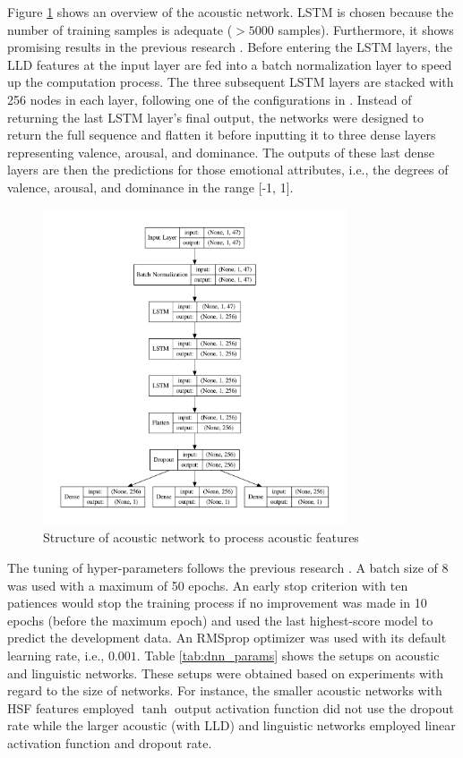 Figure \ref{fig:acoustic_model} shows an overview of the acoustic network.
LSTM is chosen because the number of training samples is adequate ($> 5000$
samples). Furthermore, it shows promising results in the previous research
\cite{Schmitt2018}.  Before entering the LSTM layers, the LLD features at the
input layer are fed into a batch normalization layer to speed up the
computation process. The three subsequent LSTM layers are stacked with 256
nodes in each layer, following one of the configurations in
\cite{Abdelwahab2018}. Instead of returning the last LSTM layer's final output,
the networks were designed to return the full sequence and flatten it before
inputting it to three dense layers representing valence, arousal, and
dominance. The outputs of these last dense layers are then the predictions for
those emotional attributes, i.e., the degrees of valence, arousal, and
dominance in the range [-1, 1]. 

\begin{figure}[htpb]
    \centering
    \includegraphics[width=0.8\textwidth]{../fig/model_acoustic.pdf}
    \caption{Structure of acoustic network to process acoustic features}
    \label{fig:acoustic_model}
    \end{figure}

The tuning of hyper-parameters follows the previous research
\cite{Atmaja2019b,Atmaja2020d}. A batch size of 8 was used with a maximum of 50
epochs. An early stop criterion with ten patiences would stop the training
process if no improvement was made in 10 epochs (before the maximum epoch) and
used the last highest-score model to predict the development data. An RMSprop
optimizer was used with its default learning rate, i.e., $0.001$. Table
\ref{tab:dnn_params} shows the setups on acoustic and linguistic networks. These
setups were obtained based on experiments with regard to the size of networks.
For instance, the smaller acoustic networks with HSF features employed $\tanh$
output activation function did not use the dropout rate while the larger
acoustic (with LLD) and linguistic networks employed linear activation
function and dropout rate.

